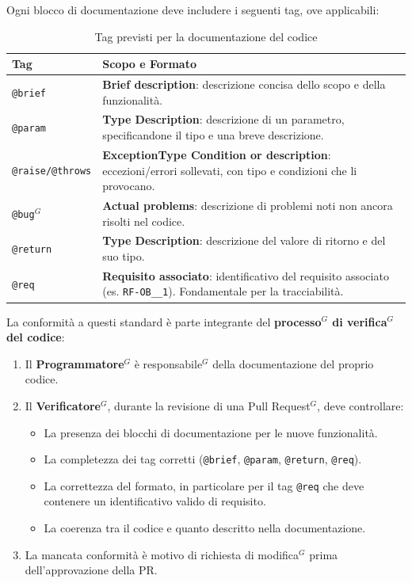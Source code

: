Ogni blocco di documentazione deve includere i seguenti tag, ove applicabili:
\begin{table}[H]
	\centering
	\renewcommand{\arraystretch}{1.15}
	\begin{tabular}{|p{}|p{}|}
	    \hline
	    \textbf{Tag} & \textbf{Scopo e Formato} \\
	    \hline
	    \texttt{@brief} & \textbf{Brief description}: descrizione concisa dello scopo e della funzionalità. \\
	    \hline
	    \texttt{@param} & \textbf{Type Description}: descrizione di un parametro, specificandone il tipo e una breve descrizione. \\
	    \hline
	    \texttt{@raise/@throws} & \textbf{ExceptionType Condition or description}: eccezioni/errori sollevati, con tipo e condizioni che li provocano. \\
	    \hline
	    \texttt{@bug$^G$} & \textbf{Actual problems}: descrizione di problemi noti non ancora risolti nel codice. \\
	    \hline
	    \texttt{@return} & \textbf{Type Description}: descrizione del valore di ritorno e del suo tipo. \\
	    \hline
	    \texttt{@req} & \textbf{Requisito associato}: identificativo del requisito associato (es. \texttt{RF-OB\_\_1}). Fondamentale per la tracciabilità. \\
	    \hline
	\end{tabular}
	\caption{Tag previsti per la documentazione del codice}
\end{table}

	La conformità a questi standard è parte integrante del \textbf{processo$^G$ di verifica$^G$ del codice}:
	\begin{enumerate}[itemsep=3pt, parsep=1pt, label=\arabic*.]
		\item Il \textbf{Programmatore$^G$} è responsabile$^G$ della documentazione del proprio codice.
		\item Il \textbf{Verificatore$^G$}, durante la revisione di una Pull Request$^G$, deve controllare:
		\begin{itemize}[itemsep=2pt, parsep=1pt, label=$\circ$]
			\item La presenza dei blocchi di documentazione per le nuove funzionalità.
			\item La completezza dei tag corretti (\texttt{@brief}, \texttt{@param}, \texttt{@return}, \texttt{@req}).
			\item La correttezza del formato, in particolare per il tag \texttt{@req} che deve contenere un identificativo valido di requisito.
			\item La coerenza tra il codice e quanto descritto nella documentazione.
		\end{itemize}
		\item La mancata conformità è motivo di richiesta di modifica$^G$ prima dell'approvazione della PR.
	\end{enumerate}

